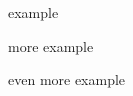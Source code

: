 \begin{frame}

\begin{block}{}
	example
\end{block}
\begin{block}{}
	more example
\end{block}
\begin{block}{}
	even more example
\end{block}
\end{frame}